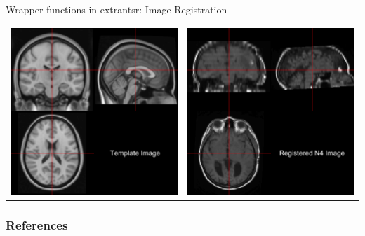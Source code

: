 \documentclass[11pt]{beamer}\usepackage[]{graphicx}\usepackage[]{color}
\begin{document}
\begin{frame}[fragile]{Wrapper functions in extrantsr: Image Registration}

\begin{tabular}{cc}
\includegraphics[width=0.5\linewidth]{Template.png} & \includegraphics[width=0.5\linewidth]{Reg_Image.png}
\end{tabular}

\end{frame}

\begin{frame}[t,allowframebreaks]
  \frametitle{References}
  \printbibliography
 \end{frame}
 
\end{document}
